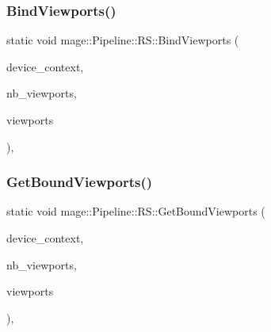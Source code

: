 \subsubsection{\texorpdfstring{Bind\+Viewports()}{BindViewports()}}
{\footnotesize\ttfamily static void mage\+::\+Pipeline\+::\+R\+S\+::\+Bind\+Viewports (\begin{DoxyParamCaption}\item[{I\+D3\+D11\+Device\+Context4 $\ast$}]{device\+\_\+context,  }\item[{\hyperlink{namespacemage_a41c104c036fba3756a74e19f793eeaa1}{U32}}]{nb\+\_\+viewports,  }\item[{const D3\+D11\+\_\+\+V\+I\+E\+W\+P\+O\+RT $\ast$}]{viewports }\end{DoxyParamCaption})\hspace{0.3cm}{\ttfamily [static]}, {\ttfamily [noexcept]}}

\hypertarget{structmage_1_1_pipeline_1_1_r_s_ab807c959aa17ed7db5b7158502551da0}{}\label{structmage_1_1_pipeline_1_1_r_s_ab807c959aa17ed7db5b7158502551da0} 
\subsubsection{\texorpdfstring{Get\+Bound\+Viewports()}{GetBoundViewports()}}
{\footnotesize\ttfamily static void mage\+::\+Pipeline\+::\+R\+S\+::\+Get\+Bound\+Viewports (\begin{DoxyParamCaption}\item[{I\+D3\+D11\+Device\+Context4 $\ast$}]{device\+\_\+context,  }\item[{\hyperlink{namespacemage_a41c104c036fba3756a74e19f793eeaa1}{U32} $\ast$}]{nb\+\_\+viewports,  }\item[{D3\+D11\+\_\+\+V\+I\+E\+W\+P\+O\+RT $\ast$}]{viewports }\end{DoxyParamCaption})\hspace{0.3cm}{\ttfamily [static]}, {\ttfamily [noexcept]}}

